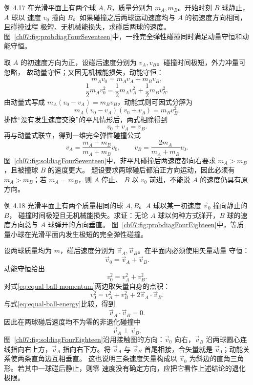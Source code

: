 \Needspace{0.30\textheight}
\begin{origexamplebox}{例 4.17}
在光滑平面上有两个球 $A,B$，质量分别为 $m_A,m_B$。开始时刻 $B$ 球静止，$A$ 球以
速度 $v_0$ 撞向 $B$。如果碰撞之后两球运动速度均与 $A$ 的初速度方向相同，且碰撞过程
极短、无机械能损失，求碰后两球的速度。
图~\ref{ch07:fig:probdiagFourSeventeen}中，一维完全弹性碰撞同时满足动量守恒和动能守恒。
\probdiagFourSeventeen
\end{origexamplebox}

\begin{xesolution}
取 $A$ 的初速度方向为正，设碰后速度分别为 $v_A,v_B$。碰撞时间极短，外力冲量可忽略，
故动量守恒；又因无机械能损失，动能守恒：
\[
 m_Av_0=m_Av_A+m_Bv_B,
\]
\[
 \frac12m_Av_0^2
 =\frac12m_Av_A^2+\frac12m_Bv_B^2.
\]
由动量式写成 $m_A(v_0-v_A)=m_Bv_B$，动能式则可因式分解为
\[
 m_A(v_0-v_A)(v_0+v_A)=m_Bv_B^2.
\]
排除“没有发生速度交换”的平凡情形后，两式相除得到
\[
 v_0+v_A=v_B.
\]
再与动量式联立，得到一维完全弹性碰撞公式
\[
 \boxed{v_A=\frac{m_A-m_B}{m_A+m_B}v_0},
 \qquad
 \boxed{v_B=\frac{2m_A}{m_A+m_B}v_0}.
\]
图~\ref{ch07:fig:soldiagFourSeventeen}中，非平凡碰撞后两速度都向右要求 $m_A>m_B$，且被撞球 $B$ 的速度更大。
\soldiagFourSeventeen
题设要求两球碰后都沿正方向运动，因此必须有 $m_A>m_B$；若 $m_A=m_B$，则 $A$ 停止、
$B$ 以 $v_0$ 前进，不能说 $A$ 的速度仍具有原方向。
\end{xesolution}

\Needspace{0.29\textheight}
\begin{origexamplebox}{例 4.18}
光滑平面上有两个质量相同的球 $A,B$。$A$ 球以某一初速度 $\vec v_0$ 撞向静止的 $B$，
碰撞时间极短且无机械能损失。求证：无论 $A$ 球以何种方式弹开，$B$ 球的速度方向总与
$A$ 球弹开的方向垂直。
图~\ref{ch07:fig:probdiagFourEighteen}中，等质量小球在光滑平面内发生极短的完全弹性碰撞。
\probdiagFourEighteen
\end{origexamplebox}

\begin{xesolution}
设两球质量均为 $m$，碰后速度分别为 $\vec v_A,\vec v_B$。在平面内必须使用矢量动量
守恒：
\begin{equation}\label{eq:equal-ball-momentum}
 \vec v_0=\vec v_A+\vec v_B.
\end{equation}
动能守恒给出
\begin{equation}\label{eq:equal-ball-energy}
 v_0^2=v_A^2+v_B^2.
\end{equation}
对式\eqref{eq:equal-ball-momentum}两边取矢量自身的点积：
\[
 v_0^2=v_A^2+v_B^2+2\vec v_A\cdot\vec v_B.
\]
与式\eqref{eq:equal-ball-energy}比较，得到
\[
 \vec v_A\cdot\vec v_B=0.
\]
因此在两球碰后速度均不为零的非退化碰撞中
\[
 \boxed{\vec v_A\perp\vec v_B}.
\]
图~\ref{ch07:fig:soldiagFourEighteen}沿用接触图的方向：$\vec v_0$ 向右，$\vec v_B$ 沿两球圆心连线指向右上方，$\vec v_A$ 指向右下方。将 $\vec v_A$ 与 $\vec v_B$ 首尾相接，合矢量就是 $\vec v_0$；动能关系使两条直角边互相垂直。
\soldiagFourEighteen
这也说明三条速度矢量构成以 $\vec v_0$ 为斜边的直角三角形。若其中一球碰后静止，则零
速度没有确定方向，应把它看作上述结论的退化极限。
\end{xesolution}

